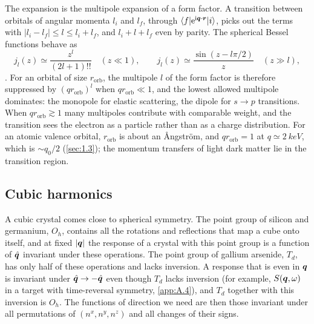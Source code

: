 The expansion is the multipole expansion of a form factor. A transition between orbitals of angular momenta $l_i$ and $l_f$, through $\langle f|\mathrm{e}^{\mathrm{i}\bm{q}\cdot\bm{r}}|i\rangle$, picks out the terms with $|l_i - l_f| \le l \le l_i + l_f$, and $l_i + l + l_f$ even by parity. The spherical Bessel functions behave as
\begin{equation}
  j_l(z) \simeq \frac{z^l}{(2l + 1)!!} \quad (z \ll 1), \qquad j_l(z) \simeq \frac{\sin(z - l\pi/2)}{z} \quad (z \gg l) ,
  \label{eq:C.3-jlimits}
\end{equation}
\cite[Eqs.~(10.52.1) and (10.52.3)]{olver2010nist}. For an orbital of size $r_{\mathrm{orb}}$, the multipole $l$ of the form factor is therefore suppressed by $(qr_{\mathrm{orb}})^l$ when $qr_{\mathrm{orb}} \ll 1$, and the lowest allowed multipole dominates: the monopole for elastic scattering, the dipole for $s \to p$ transitions. When $qr_{\mathrm{orb}} \gtrsim 1$ many multipoles contribute with comparable weight, and the transition sees the electron as a particle rather than as a charge distribution. For an atomic valence orbital, $r_{\mathrm{orb}}$ is about an \AA ngstr\"om, and $qr_{\mathrm{orb}} = 1$ at $q \simeq \SI{2}{keV}$, which is $\sim q_0/2$ (\cref{sec:1.3}); the momentum transfers of light dark matter lie in the transition region.

\subsection{Cubic harmonics}

A cubic crystal comes close to spherical symmetry. The point group of silicon and germanium, $O_h$, contains all the rotations and reflections that map a cube onto itself, and at fixed $|\bm{q}|$ the response of a crystal with this point group is a function of $\hat{\bm{q}}$ invariant under these operations. The point group of gallium arsenide, $T_d$, has only half of these operations and lacks inversion. A response that is even in $\bm{q}$ is invariant under $\hat{\bm{q}} \to -\hat{\bm{q}}$ even though $T_d$ lacks inversion (for example, $S(\bm{q},\omega)$ in a target with time-reversal symmetry, \cref{app:A.4}), and $T_d$ together with this inversion is $O_h$. The functions of direction we need are then those invariant under all permutations of $(n^x, n^y, n^z)$ and all changes of their signs.

